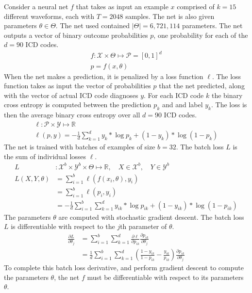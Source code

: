 Consider a neural net $f$ that takes as input an example $x$ comprised of $k=15$ different waveforms, each with $T=2048$ samples.  The net is also given parameters $\theta \in \Theta$.  The net used contained $|\Theta| = 6,721,114$ parameters.  The net outputs a vector of binary outcome probabilities $p$, one probability for each of the $d=90$ ICD codes.
\begin{gather}
    f: \mathcal{X} \times \Theta \mapsto \mathcal{P} = [0, 1]^d \\
    p = f(x, \theta)
\end{gather}
When the net makes a prediction, it is penalized by a loss function $\ell$.  The loss function takes as input the vector of probabilities $p$ that the net predicted, along with the vector of actual ICD code diagnoses $y$.  For each ICD code $k$ the binary cross entropy is computed between the prediction $p_k$ and and label $y_k$.  The loss is then the average binary cross entropy over all $d=90$ ICD codes.
\begin{gather}
    \ell: \mathcal{P} \times \mathcal{Y} \mapsto \mathbb{R} \\
    \ell(p, y) = -\frac{1}{d} \sum_{k=1}^d 
        y_k * \log p_k + (1 - y_k) * \log(1 - p_k)
\end{gather}
The net is trained with batches of examples of size $b = 32$.  The batch loss $L$ is the sum of individual losses $\ell$.
\begin{align}
    L &: \mathcal{X}^b \times \mathcal{Y}^b 
        \times \Theta \mapsto \mathbb{R}, \quad
        X \in \mathcal{X}^b, \quad 
        Y \in \mathcal{Y}^b \\
    L(X, Y, \theta) 
        &= \sum_{i=1}^b \ell(f(x_i, \theta), y_i) \\
        &= \sum_{i=1}^b \ell(p_i, y_i) \\
        &= -\frac{1}{d} \sum_{i=1}^b \sum_{k=1}^d 
            y_{ik} * \log p_{ik} + (1 - y_{ik}) * \log(1 - p_{ik})
\end{align}
The parameters $\theta$ are computed with stochastic gradient descent.  The batch loss $L$ is differentiable with respect to the $j$th parameter of $\theta$.
\begin{align}
    \frac{\partial L}{\partial \theta_j} 
        &= \sum_{i=1}^b \sum_{k=1}^d 
            \frac{\partial \ell}{\partial p_{ik}}  
            \frac{\partial p_{ik}}{\partial \theta_j} \\
        &= \frac{1}{d} \sum_{i=1}^b \sum_{k=1}^d
            \left(
                \frac{1 - y_{ik}}{1 - p_{ik}} - \frac{y_{ik}}{p_{ik}}
            \right)
            \frac{\partial p_{ik}}{\partial \theta_j}
\end{align}
To complete this batch loss derivative, and perform gradient descent to compute the parameters $\theta$, the net $f$ must be differentiable with respect to its parameters $\theta$.

